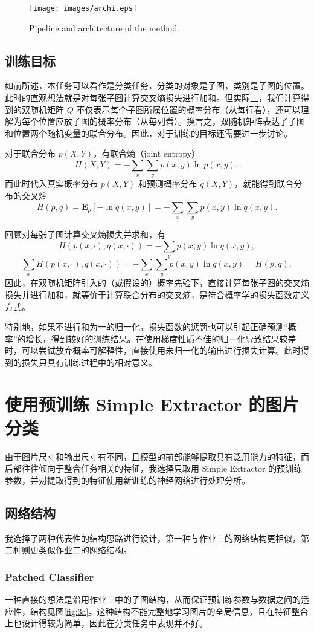 \documentclass[a4paper]{article}
\begin{document}
\begin{figure}[H]
    \centering
    \texttt{[image: images/archi.eps]}
    \caption{Pipeline and architecture of the method.}
    \label{fig:2}
\end{figure}

\subsection{训练目标}
如前所述，本任务可以看作是分类任务，分类的对象是子图，类别是子图的位置。此时的直观想法就是对每张子图计算交叉熵损失进行加和。但实际上，我们计算得到的双随机矩阵 $Q$ 不仅表示每个子图所属位置的概率分布（从每行看），还可以理解为每个位置应放子图的概率分布（从每列看）。换言之，双随机矩阵表达了子图和位置两个随机变量的联合分布。因此，对于训练的目标还需要进一步讨论。

对于联合分布 $p(X,Y)$，有联合熵（joint entropy）
\[
    H(X,Y) = -\sum_x \sum_y p(x, y) \ln p(x,y),
\]
而此时代入真实概率分布 $p(X,Y)$ 和预测概率分布 $q(X, Y)$，就能得到联合分布的交叉熵
\[
    H(p,q) = \mathbf{E}_p\left[-\ln q(x,y)\right] = -\sum_x \sum_y p(x, y) \ln q(x,y).
\]

回顾对每张子图计算交叉熵损失并求和，有
\[
    H(p(x, \cdot), q(x, \cdot)) =  -\sum_y p(x, y) \ln q(x,y),
\]
\[
    \sum_x H(p(x, \cdot), q(x, \cdot)) =  -\sum_x\sum_y p(x, y) \ln q(x,y) = H(p,q),
\]
因此，在双随机矩阵引入的（或假设的）概率先验下，直接计算每张子图的交叉熵损失并进行加和，就等价于计算联合分布的交叉熵，是符合概率学的损失函数定义方式。

特别地，如果不进行和为一的归一化，损失函数的惩罚也可以引起正确预测“概率”的增长，得到较好的训练结果。在使用梯度性质不佳的归一化导致结果较差时，可以尝试放弃概率可解释性，直接使用未归一化的输出进行损失计算。此时得到的损失只具有训练过程中的相对意义。

\section{使用预训练 Simple Extractor 的图片分类}
由于图片尺寸和输出尺寸有不同，且模型的前部能够提取具有泛用能力的特征，而后部往往倾向于整合任务相关的特征，我选择只取用 Simple Extractor 的预训练参数，并对提取得到的特征使用新训练的神经网络进行处理分析。
\subsection{网络结构}

我选择了两种代表性的结构思路进行设计，第一种与作业三的网络结构更相似，第二种则更类似作业二的网络结构。
\subsubsection{Patched Classifier}
一种直接的想法是沿用作业三中的子图结构，从而保证预训练参数与数据之间的适应性，结构见图\ref{fig:3a}。这种结构不能完整地学习图片的全局信息，且在特征整合上也设计得较为简单，因此在分类任务中表现并不好。
\end{document}
